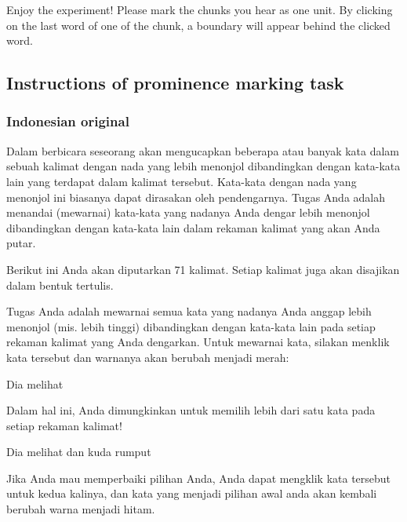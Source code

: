 Enjoy the experiment!\newline
Please mark the chunks you hear as one unit.
By clicking on the last word of one of the chunk, a boundary will appear behind the clicked word.


\subsection{Instructions of prominence marking task}
\label{Instructions prominences}

\subsubsection{Indonesian original}
\label{Instructions_p_IND}
Dalam berbicara seseorang akan mengucapkan beberapa atau banyak kata dalam sebuah kalimat dengan nada yang lebih menonjol dibandingkan dengan kata-kata lain 
yang terdapat dalam kalimat tersebut. 
Kata-kata dengan nada yang menonjol ini biasanya dapat dirasakan oleh pendengarnya. 
Tugas Anda adalah menandai (mewarnai) kata-kata yang nadanya Anda dengar lebih menonjol dibandingkan dengan kata-kata lain dalam rekaman kalimat yang akan Anda putar. 
\newline

Berikut ini Anda akan diputarkan 71 kalimat. Setiap kalimat juga akan disajikan dalam bentuk tertulis. \newline

Tugas Anda adalah mewarnai semua kata yang nadanya Anda anggap lebih menonjol (mis. lebih tinggi) dibandingkan dengan kata-kata lain pada setiap rekaman kalimat yang Anda dengarkan. 
Untuk mewarnai kata, silakan menklik kata tersebut dan warnanya akan berubah menjadi merah:\newline

\begin{center}
	Dia melihat 
\end{center}
Dalam hal ini, Anda dimungkinkan untuk memilih lebih dari satu kata pada setiap rekaman kalimat! 

\begin{center}
	Dia melihat  dan kuda  rumput
	
\end{center}
Jika Anda mau memperbaiki pilihan Anda, Anda dapat mengklik kata tersebut untuk kedua kalinya, dan kata yang menjadi pilihan awal anda akan kembali berubah warna menjadi hitam.\newline

